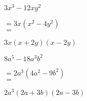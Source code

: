 \begin{tasks}
    \task \begin{exercise}$3x^3-12xy^2$
              \begin{envSolution}
                 $ =3x(x^2-4y^2)   $\\
                 $ = $				 
                     \begin{shortsolution}
  	                    $ 3x(x+2y)(x-2y)$
                     \end{shortsolution}
              \end{envSolution}%
          \end{exercise}

    \task \begin{exercise}$8a^5-18a^3b^2$
              \begin{envSolution}
                 $ =2a^3(4a^2-9b^2)   $\\
                 $ = $				 
                     \begin{shortsolution}
  	                    $2a^3(2a+3b)(2a-3b)$
                     \end{shortsolution}
              \end{envSolution}%
          \end{exercise}
\end{tasks}



\clearpage
\printshortsolutions

